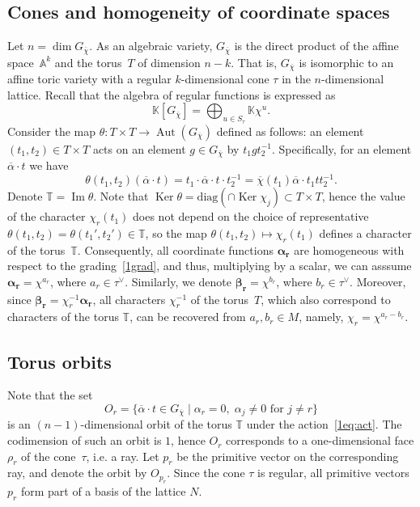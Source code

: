 \documentclass[a4paper, 11pt]{amsart}
\theoremstyle{plain}
\theoremstyle{remark}
\theoremstyle{definition}
\renewcommand{\AA}{\mathbb{A}}
\newcommand{\KK}{\mathbb{K}}
\newcommand{\GG}{G_{\overline{\chi}}}
\newcommand{\TT}{\mathbb{T}}
\newcommand{\ol}[1]{\overline{#1}}
\newcommand{\Alp}[1]{\pmb{\alpha_{#1}}}
\newcommand{\Bet}[1]{\pmb{\beta_{#1}}}
\renewcommand{\Im}{\mathop{\text{Im}}}
\DeclareMathOperator{\Ker}{Ker}
\DeclareMathOperator{\Aut}{Aut}
\begin{document}
\subsection{Cones and homogeneity of coordinate spaces}\label{sec:conhom}
Let $n = \dim \GG$. As an algebraic variety, $\GG$ is the direct product of the affine space~$\AA^k$ and the torus~$T$ of dimension $n-k$. That is, $\GG$ is isomorphic to an affine toric variety with a regular $k$-dimensional cone $\tau$ in the $n$-dimensional lattice. Recall that the algebra of regular functions is expressed as
\begin{equation}\label{1grad}
	\KK[\GG] = \bigoplus_{u \in S_\tau} \KK \chi^u.  
\end{equation}
Consider the map $\theta\colon T \times T \rightarrow \Aut(\GG)$ defined as follows: an element $(t_1, t_2) \in T \times T$ acts on an element $g \in \GG$ by $t_1 g t_2^{-1}$. Specifically, for an element $\ol{\alpha}\cdot t$ we have
\begin{equation}\label{1eq:act}
	\theta(t_1, t_2)(\ol{\alpha}\cdot t) = t_1\cdot \ol{\alpha}\cdot t\cdot t_2^{-1} = \ol{\chi}(t_1)\ol{\alpha}\cdot t_1 t t_2^{-1}.
\end{equation}
Denote $\TT = \Im \theta$. Note that $\Ker \theta = \text{diag} (\cap \Ker \chi_j) \subset T \times T$, hence the value of the character $\chi_r(t_1)$ does not depend on the choice of representative $\theta(t_1, t_2) = \theta(t_1', t_2') \in \TT$, so the map $\theta(t_1, t_2) \mapsto \chi_r(t_1)$ defines a character of the torus~$\TT$. Consequently, all coordinate functions $\Alp{r}$ are homogeneous with respect to the grading~\eqref{1grad}, and thus, multiplying by a scalar, we can asssume $\Alp{r} = \chi^{a_r}$, where $a_r \in \tau^\vee$.
Similarly, we denote $\Bet{r} = \chi^{b_r}$, where $b_r \in \tau^\vee$. Moreover, since $\Bet{r} = \chi_r^{-1} \Alp{r}$, all characters $\chi_r^{-1}$ of the torus~$T$, which also correspond to characters of the torus $\TT$, can be recovered from $a_r, b_r \in M$, namely, $\chi_r = \chi^{a_r - b_r}$.

\subsection{Torus orbits}\label{1sec:orb}
Note that the set \[O_r = \{ \ol{\alpha}\cdot t \in \GG \mid \alpha_r = 0, \; \alpha_j \neq 0 \text{ for } j \neq r \}\]
is an $(n-1)$-dimensional orbit of the torus $\TT$ under the action~\eqref{1eq:act}. The codimension of such an orbit is $1$, hence $O_r$ corresponds to a one-dimensional face $\rho_r$ of the cone~$\tau$, i.e. a ray. Let $p_r$ be the primitive vector on the corresponding ray, and denote the orbit by $O_{p_r}$. Since the cone $\tau$ is regular, all primitive vectors $p_r$ form part of a basis of the lattice $N$.
\end{document}
